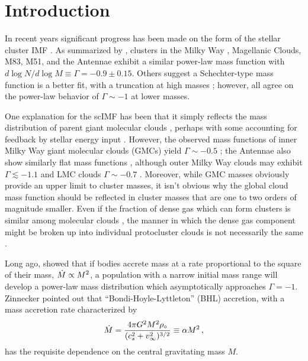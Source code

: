 \documentclass[iop]{emulateapj}
\begin{document}
\section{Introduction}

In recent years significant progress has been made on the form of the stellar cluster
IMF \citep[scIMF;][]{zhang99,degrijs03,mccrady07}.
As summarized by \citet{fallchandar12}, clusters in the Milky
Way \citep{lada03}, Magellanic Clouds, M83, M51, and the Antennae exhibit a similar power-law mass function
with $d \log N/ d \log M \equiv \Gamma = -0.9 \pm 0.15$. Others suggest a Schechter-type mass
function is a better fit, with a truncation at high masses \citep{gieles06,bastian08}; however,
all agree on the power-law behavior of $\Gamma \sim -1$ at lower masses.

One explanation for the scIMF has been that it simply reflects the mass distribution of
parent giant molecular clouds \citep[e.g.,][]{elmegreenefremov97}, perhaps with some
accounting for feedback by stellar energy input \citep{fall10}.  However,
the observed mass functions of inner Milky Way giant
molecular clouds (GMCs) yield $\Gamma \sim -0.5$ \citep{williamsmckee97}; the Antennae
also show similarly flat mass functions \citep{wilson03,wei12}, although outer Milky
Way clouds may exhibit $\Gamma \lesssim -1.1$ and LMC clouds $\Gamma \sim -0.7$ \citep{rosolowsky05}.
Moreover, while GMC masses obviously provide an upper limit to cluster masses, it isn't obvious
why the global cloud mass function should be reflected in cluster masses that are one to two orders
of magnitude smaller.  Even if the fraction of dense gas which can form clusters is similar
among molecular clouds \citep[and the evidence for this is mixed; see][]{bastian08,
lada10,burkerthartmann13,battistiheyer14}, the manner in which the dense gas component might be
broken up into individual protocluster clouds is not necessarily the same
\citep[see ][for a model of modified turbulent acccretion]{hennebelle12}.

Long ago, \citet{zinnecker82} showed that if bodies accrete mass at a rate proportional
to the square of their mass, $\dot{M} \propto M^2$, a population with a narrow initial mass
range will develop a power-law mass distribution which asymptotically approaches $\Gamma = -1$.
Zinnecker pointed out that ``Bondi-Hoyle-Lyttleton'' (BHL) accretion, with a mass accretion rate characterized by
\begin{equation}
\dot{M} = {4 \pi G^2 M^2 \rho_{\circ} \over (c_s^2 + v_{\infty}^2)^{3/2}} \equiv \alpha M^2\,,
\label{eq:bhl}
\end{equation}
\citep[see discussion in][]{edgar04}
has the requisite dependence on the central gravitating
mass $M$.
 
\end{document}
